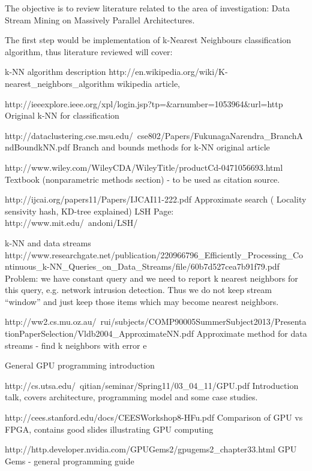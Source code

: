 \documentclass[12]{article}
\begin{document}
The objective is to review literature related to the area of investigation: Data Stream Mining on Massively Parallel Architectures.

The first step would be implementation of k-Nearest Neighbours classification algorithm, thus literature reviewed will cover:
\begin{list}{*}{}
\item{k-NN algorithm description}
	http://en.wikipedia.org/wiki/K-nearest_neighbors_algorithm 
	wikipedia article, 
	
	http://ieeexplore.ieee.org/xpl/login.jsp?tp=&arnumber=1053964&url=http%
	Original k-NN for classification
	
	http://dataclustering.cse.msu.edu/~cse802/Papers/FukunagaNarendra_BranchAndBoundkNN.pdf
	Branch and bounds methods for k-NN original article
	
	http://www.wiley.com/WileyCDA/WileyTitle/productCd-0471056693.html
	Textbook (nonparametric methods section) - to be used as citation source.
	
	http://ijcai.org/papers11/Papers/IJCAI11-222.pdf
	Approximate search ( Locality sensivity hash, KD-tree explained)
	LSH Page: http://www.mit.edu/~andoni/LSH/
	
\item{k-NN and data streams}
	http://www.researchgate.net/publication/220966796_Efficiently_Processing_Continuous_k-NN_Queries_on_Data_Streams/file/60b7d527cea7b91f79.pdf
	Problem: we have constant query and we need to report k nearest neighbors for this query, e.g. network intrusion detection. 
	Thus we do not keep stream ``window'' and just keep those items which may become nearest neighbors. 
	
	http://ww2.cs.mu.oz.au/~rui/subjects/COMP90005SummerSubject2013/PresentationPaperSelection/Vldb2004_ApproximateNN.pdf
	Approximate method for data streams - find k neighbors with error e
	
		

\item{General GPU programming introduction}
	
	http://cs.utsa.edu/~qitian/seminar/Spring11/03_04_11/GPU.pdf
	Introduction talk, covers architecture, programming model and some case studies.
	
	http://cees.stanford.edu/docs/CEESWorkshop8-HFu.pdf
	Comparison of GPU vs FPGA, contains good slides illustrating GPU computing

	http://http.developer.nvidia.com/GPUGems2/gpugems2_chapter33.html
	GPU Gems - general programming guide
	

\end{list}
\end{document}
